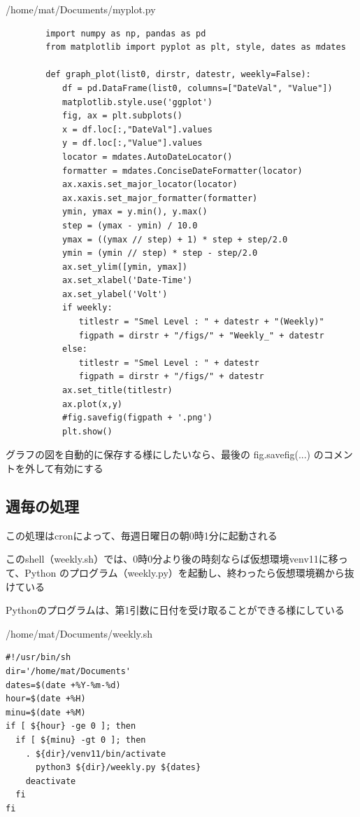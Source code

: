 \documentclass[12pt,a4paper,uplatex]{jsbook}
\begin{document}
\begin{itembox}[l]{/home/mat/Documents/myplot.py}
	\begin{verbatim}
		import numpy as np, pandas as pd
		from matplotlib import pyplot as plt, style, dates as mdates
		
		def graph_plot(list0, dirstr, datestr, weekly=False):
		　　df = pd.DataFrame(list0, columns=["DateVal", "Value"])
		　　matplotlib.style.use('ggplot')
		　　fig, ax = plt.subplots()
		　　x = df.loc[:,"DateVal"].values
		　　y = df.loc[:,"Value"].values
		　　locator = mdates.AutoDateLocator()
		　　formatter = mdates.ConciseDateFormatter(locator)
		　　ax.xaxis.set_major_locator(locator)
		　　ax.xaxis.set_major_formatter(formatter)
		　　ymin, ymax = y.min(), y.max()
		　　step = (ymax - ymin) / 10.0
		　　ymax = ((ymax // step) + 1) * step + step/2.0
		　　ymin = (ymin // step) * step - step/2.0
		　　ax.set_ylim([ymin, ymax])
		　　ax.set_xlabel('Date-Time')
		　　ax.set_ylabel('Volt')
		　　if weekly:
		　　　　titlestr = "Smel Level : " + datestr + "(Weekly)"
		　　　　figpath = dirstr + "/figs/" + "Weekly_" + datestr
		　　else:
		　　　　titlestr = "Smel Level : " + datestr
		　　　　figpath = dirstr + "/figs/" + datestr
		　　ax.set_title(titlestr)
		　　ax.plot(x,y)
		　　#fig.savefig(figpath + '.png')
		　　plt.show()	
	\end{verbatim}
\end{itembox}

グラフの図を自動的に保存する様にしたいなら、最後の fig.savefig(...) のコメントを外して有効にする

\newpage

\subsection{週毎の処理}

この処理はcronによって、毎週日曜日の朝0時1分に起動される

このshell（weekly.sh）では、0時0分より後の時刻ならば仮想環境venv11に移って、Python のプログラム（weekly.py）を起動し、終わったら仮想環境鵜から抜けている

Pythonのプログラムは、第1引数に日付を受け取ることができる様にしている

\begin{itembox}[l]{/home/mat/Documents/weekly.sh}
	\begin{verbatim}
#!/usr/bin/sh
dir='/home/mat/Documents'
dates=$(date +%Y-%m-%d)
hour=$(date +%H)
minu=$(date +%M)
if [ ${hour} -ge 0 ]; then
  if [ ${minu} -gt 0 ]; then
    . ${dir}/venv11/bin/activate
      python3 ${dir}/weekly.py ${dates}
    deactivate
  fi
fi
	\end{verbatim}
\end{itembox}
\end{document}
